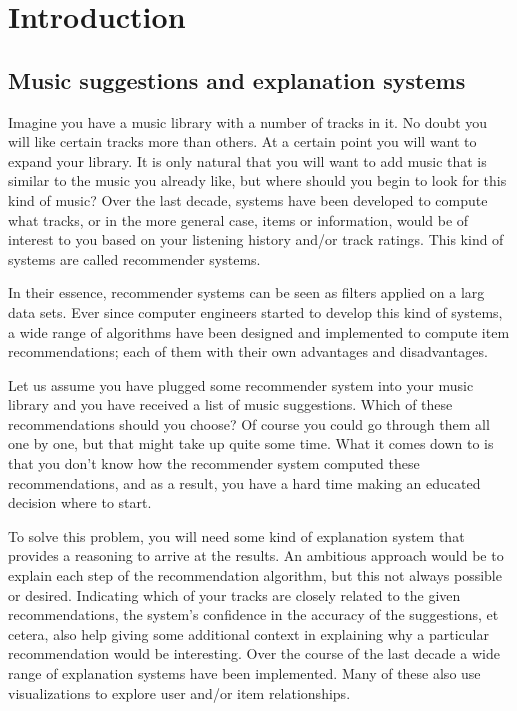 \chapter{Introduction}\label{chapter:introduction}

\section{Music suggestions and explanation systems}\label{chapter:introduction:section:context}

Imagine you have a music library with a number of tracks in it. No doubt you will like certain tracks more than others. At a certain point you will want to expand your library. It is only natural that you will want to add music that is similar to the music you already like, but where should you begin to look for this kind of music? Over the last decade, systems have been developed to compute what tracks, or in the more general case, items or information, would be of interest to you based on your listening history and/or track ratings. This kind of systems are called recommender systems.

In their essence, recommender systems can be seen as filters applied on a larg data sets. Ever since computer engineers started to develop this kind of systems, a wide range of algorithms have been designed and implemented to compute item recommendations\cite{burke:2002, melville:2002:CCF:777092.777124, pazzani:2007:CRS:1768197.1768209, rajaraman:2012}; each of them with their own advantages and disadvantages.

Let us assume you have plugged some recommender system into your music library and you have received a list of music suggestions. Which of these recommendations should you choose? Of course you could go through them all one by one, but that might take up quite some time. What it comes down to is that you don't know how the recommender system computed these recommendations, and as a result, you have a hard time making an educated decision where to start.

To solve this problem, you will need some kind of explanation system that provides a reasoning to arrive at the results. An ambitious approach would be to explain each step of the recommendation algorithm, but this not always possible or desired. Indicating which of your tracks are closely related to the given recommendations, the system's confidence in the accuracy of the suggestions, et cetera, also help giving some additional context in explaining why a particular recommendation would be interesting\cite{herlocker:2000}. Over the course of the last decade a wide range of explanation systems have been implemented. Many of these also use visualizations to explore user and/or item relationships\cite{bostandjiev:2012, crnovrsanin:2011:VRN:2421953.2422013, faridani:2010:opinionspace, gou:2011:SIF:2016656.2016671, gretarsson:2010, odonovan:2008}.

